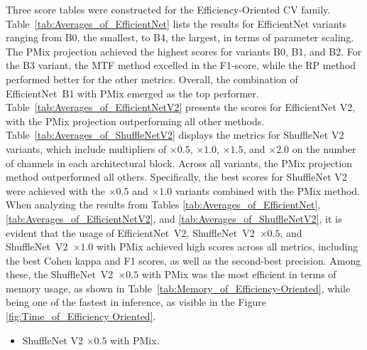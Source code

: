 Three score tables were constructed for the Efficiency-Oriented \gls{CV} family.
Table~\ref{tab:Averages_of_EfficientNet} lists the results for EfficientNet variants ranging from B0, the smallest, to B4, the largest, in terms of parameter scaling. The \gls{PMix} projection achieved the highest scores for variants B0, B1, and B2. For the B3 variant, the \gls{MTF} method excelled in the F1-score, while the \gls{RP} method performed better for the other metrics. Overall, the combination of \mbox{EfficientNet B1} with \gls{PMix} emerged as the top performer.
Table~\ref{tab:Averages_of_EfficientNetV2} presents the scores for EfficientNet V2, with the \gls{PMix} projection outperforming all other methods.
Table~\ref{tab:Averages_of_ShuffleNetV2} displays the metrics for ShuffleNet V2 variants, which include multipliers of $\times 0.5$, $\times 1.0$, $\times 1.5$, and $\times 2.0$ on the number of channels in each architectural block. Across all variants, the \gls{PMix} projection method outperformed all others. Specifically, the best scores for ShuffleNet V2 were achieved with the $\times 0.5$ and $\times 1.0$ variants combined with the \gls{PMix} method.
When analyzing the results from Tables  \ref{tab:Averages_of_EfficientNet}, \ref{tab:Averages_of_EfficientNetV2}, and \ref{tab:Averages_of_ShuffleNetV2}, it is evident that the usage of \mbox{EfficientNet V2}, \mbox{ShuffleNet V2 $\times 0.5$}, and \mbox{ShuffleNet V2 $\times 1.0$}  with \gls{PMix} achieved high scores across all metrics, including the best Cohen kappa and F1 scores, as well as the second-best precision. Among these, the \mbox{ShuffleNet V2 $\times 0.5$} with \gls{PMix} was the most efficient in terms of memory usage, as shown in Table~\ref{tab:Memory_of_Efficiency-Oriented}, while being one of the fastest in inference, as visible in the Figure \ref{fig:Time_of_Efficiency Oriented}.  
\begin{itemize}
	\item ShuffleNet V2 $\times 0.5$ with \gls{PMix}.
\end{itemize}



